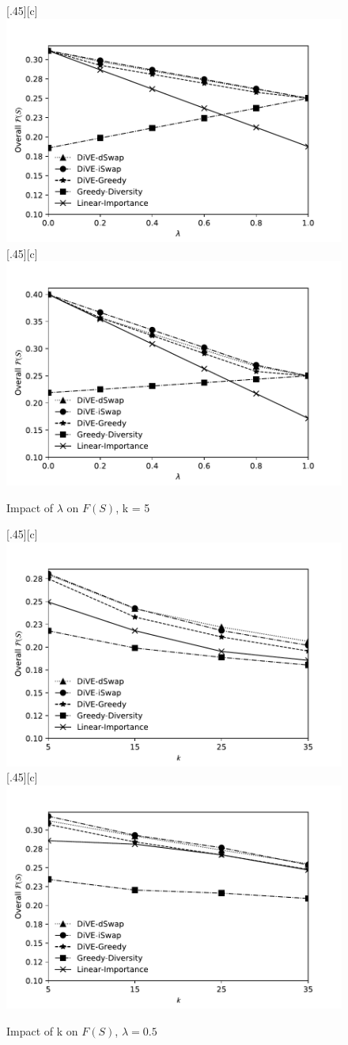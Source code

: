 \begin{figure}[t]
	\centering
	[.45\linewidth][c]{%
		\includegraphics[width=.45\linewidth]{figures/results/tradeoff_heart_2}}
	[.45\linewidth][c]{%
		\includegraphics[width=.45\linewidth]{figures/results/tradeoff_flights}}
	\caption{Impact of $\lambda$ on $F\left(S\right)$, k = 5}
	\label{fig:tradeoff_3_datasets}	
\end{figure}

\begin{figure}[t]
	\centering
	[.45\linewidth][c]{%
		\includegraphics[width=.45\linewidth]{figures/results/objf_heart_2}}
	[.45\linewidth][c]{%
		\includegraphics[width=.45\linewidth]{figures/results/objf_flights}}
	\caption{Impact of k on $F\left(S\right)$, $\lambda = 0.5$}
	\label{fig:objf_3_datasets}
\end{figure}


